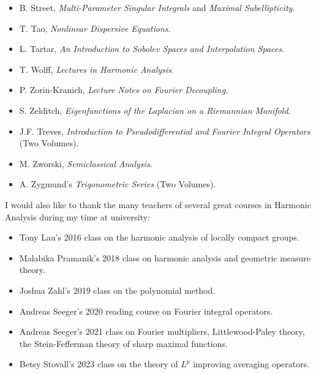 \begin{itemize}
	\item B. Street, \emph{Multi-Parameter Singular Integrals} and \emph{Maximal Subellipticity}.
	\item T. Tao, \emph{Nonlinear Dispersive Equations}.
	\item L. Tartar, \emph{An Introduction to Sobolev Spaces and Interpolation Spaces}.
	\item T. Wolff, \emph{Lectures in Harmonic Analysis}.
	\item P. Zorin-Kranich, \emph{Lecture Notes on Fourier Decoupling}.
	\item S. Zelditch, \emph{Eigenfunctions of the Laplacian on a Riemannian Manifold}.
	\item J.F. Treves, \emph{Introduction to Pseudodifferential and Fourier Integral Operators} (Two Volumes).
	\item M. Zworski, \emph{Semiclassical Analysis}.
	\item A. Zygmund's \emph{Trigonometric Series} (Two Volumes).
\end{itemize}
%
I would also like to thank the many teachers of several great courses in Harmonic Analysis during my time at university:
%
\begin{itemize}
	\item Tony Lau's 2016 class on the harmonic analysis of locally compact groups.
	\item Malabika Pramanik's 2018 class on harmonic analysis and geometric measure theory.
	\item Joshua Zahl's 2019 class on the polynomial method.
	\item Andreas Seeger's 2020 reading course on Fourier integral operators.
	\item Andreas Seeger's 2021 class on Fourier multipliers, Littlewood-Paley theory, the Stein-Fefferman theory of sharp maximal functions.
	\item Betsy Stovall's 2023 class on the theory of $L^p$ improving averaging operators.
\end{itemize}

\tableofcontents
{}


















